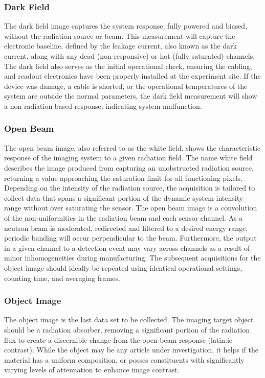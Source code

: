 \documentclass[../../main.tex]{subfiles}
\begin{document}
    \subsubsection{Dark Field}%
    The dark field image captures the system response, fully powered and biased, without the radiation source or beam.
    This measurement will capture the electronic baseline, defined by the leakage current, also known as the dark current, along with any dead (non-responsive) or hot (fully saturated) channels.
    The dark field also serves as the initial operational check, ensuring the cabling, and readout electronics have been properly installed at the experiment site.
    If the device was damage, a cable is shorted, or the operational temperatures of the system are outside the normal parameters, the dark field measurement will show a non-radiation based response, indicating system malfunction.
    \subsubsection{Open Beam}%
    The open beam image, also referred to as the white field, shows the characteristic response of the imaging system to a given radiation field.
    The name white field describes the image produced from capturing an unobstructed radiation source, returning a value approaching the saturation limit for all functioning pixels.
    Depending on the intensity of the radiation source, the acquisition is tailored to collect data that spans a significant portion of the dynamic system intensity range without over saturating the sensor.
    The open beam image is a convolution of the non-uniformities in the radiation beam and each sensor channel. 
    As a neutron beam is moderated, redirected and filtered to a desired energy range, periodic banding will occur perpendicular to the beam.
    Furthermore, the output in a given channel to a detection event may vary across channels as a result of minor inhomogeneities during manufacturing.
    The subsequent acquisitions for the object image should ideally be repeated using identical operational settings, counting time, and averaging frames.
    \subsubsection{Object Image}%
    The object image is the last data set to be collected.
    The imaging target object should be a radiation absorber, removing a significant portion of the radiation flux to create a discernible change from the open beam response (\gls{latin:ie} contrast).
    While the object may be any article under investigation, it helps if the material has a uniform composition, or posses constituents with significantly varying levels of attenuation to enhance image contrast.
\end{document}
